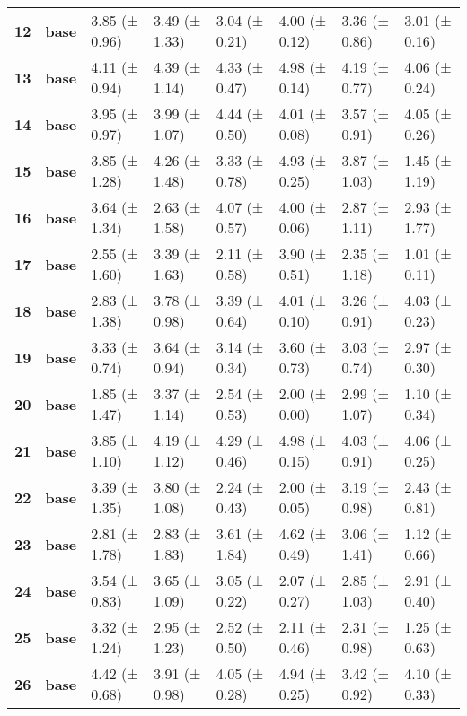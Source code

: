 \begin{longtable}{llllllll}
\cline{1-8}
\textbf{12} & \textbf{base} & 3.85 (± 0.96) & 3.49 (± 1.33) & 3.04 (± 0.21) & 4.00 (± 0.12) & 3.36 (± 0.86) & 3.01 (± 0.16) \\
\cline{1-8}
\textbf{13} & \textbf{base} & 4.11 (± 0.94) & 4.39 (± 1.14) & 4.33 (± 0.47) & 4.98 (± 0.14) & 4.19 (± 0.77) & 4.06 (± 0.24) \\
\cline{1-8}
\textbf{14} & \textbf{base} & 3.95 (± 0.97) & 3.99 (± 1.07) & 4.44 (± 0.50) & 4.01 (± 0.08) & 3.57 (± 0.91) & 4.05 (± 0.26) \\
\cline{1-8}
\textbf{15} & \textbf{base} & 3.85 (± 1.28) & 4.26 (± 1.48) & 3.33 (± 0.78) & 4.93 (± 0.25) & 3.87 (± 1.03) & 1.45 (± 1.19) \\
\cline{1-8}
\textbf{16} & \textbf{base} & 3.64 (± 1.34) & 2.63 (± 1.58) & 4.07 (± 0.57) & 4.00 (± 0.06) & 2.87 (± 1.11) & 2.93 (± 1.77) \\
\cline{1-8}
\textbf{17} & \textbf{base} & 2.55 (± 1.60) & 3.39 (± 1.63) & 2.11 (± 0.58) & 3.90 (± 0.51) & 2.35 (± 1.18) & 1.01 (± 0.11) \\
\cline{1-8}
\textbf{18} & \textbf{base} & 2.83 (± 1.38) & 3.78 (± 0.98) & 3.39 (± 0.64) & 4.01 (± 0.10) & 3.26 (± 0.91) & 4.03 (± 0.23) \\
\cline{1-8}
\textbf{19} & \textbf{base} & 3.33 (± 0.74) & 3.64 (± 0.94) & 3.14 (± 0.34) & 3.60 (± 0.73) & 3.03 (± 0.74) & 2.97 (± 0.30) \\
\cline{1-8}
\textbf{20} & \textbf{base} & 1.85 (± 1.47) & 3.37 (± 1.14) & 2.54 (± 0.53) & 2.00 (± 0.00) & 2.99 (± 1.07) & 1.10 (± 0.34) \\
\cline{1-8}
\textbf{21} & \textbf{base} & 3.85 (± 1.10) & 4.19 (± 1.12) & 4.29 (± 0.46) & 4.98 (± 0.15) & 4.03 (± 0.91) & 4.06 (± 0.25) \\
\cline{1-8}
\textbf{22} & \textbf{base} & 3.39 (± 1.35) & 3.80 (± 1.08) & 2.24 (± 0.43) & 2.00 (± 0.05) & 3.19 (± 0.98) & 2.43 (± 0.81) \\
\cline{1-8}
\textbf{23} & \textbf{base} & 2.81 (± 1.78) & 2.83 (± 1.83) & 3.61 (± 1.84) & 4.62 (± 0.49) & 3.06 (± 1.41) & 1.12 (± 0.66) \\
\cline{1-8}
\textbf{24} & \textbf{base} & 3.54 (± 0.83) & 3.65 (± 1.09) & 3.05 (± 0.22) & 2.07 (± 0.27) & 2.85 (± 1.03) & 2.91 (± 0.40) \\
\cline{1-8}
\textbf{25} & \textbf{base} & 3.32 (± 1.24) & 2.95 (± 1.23) & 2.52 (± 0.50) & 2.11 (± 0.46) & 2.31 (± 0.98) & 1.25 (± 0.63) \\
\cline{1-8}
\textbf{26} & \textbf{base} & 4.42 (± 0.68) & 3.91 (± 0.98) & 4.05 (± 0.28) & 4.94 (± 0.25) & 3.42 (± 0.92) & 4.10 (± 0.33) \\

\end{longtable}
